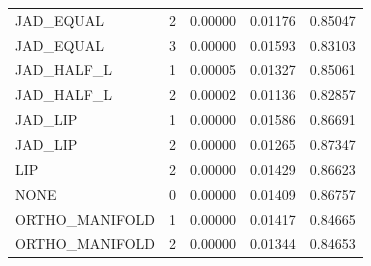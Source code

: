 \begin{table}
\begin{tabular}{lrrrr}
JAD\_EQUAL & 2 & 0.00000 & 0.01176 & 0.85047 \\
JAD\_EQUAL & 3 & 0.00000 & 0.01593 & 0.83103 \\
\hline
JAD\_HALF\_L & 1 & 0.00005 & 0.01327 & 0.85061 \\
JAD\_HALF\_L & 2 & 0.00002 & 0.01136 & 0.82857 \\
\hline
JAD\_LIP & 1 & 0.00000 & 0.01586 & 0.86691 \\
JAD\_LIP & 2 & 0.00000 & 0.01265 & 0.87347 \\
\hline
LIP & 2 & 0.00000 & 0.01429 & 0.86623 \\
\hline
NONE & 0 & 0.00000 & 0.01409 & 0.86757 \\
\hline
ORTHO\_MANIFOLD & 1 & 0.00000 & 0.01417 & 0.84665 \\
ORTHO\_MANIFOLD & 2 & 0.00000 & 0.01344 & 0.84653 \\
\bottomrule
\end{tabular}
\end{table}